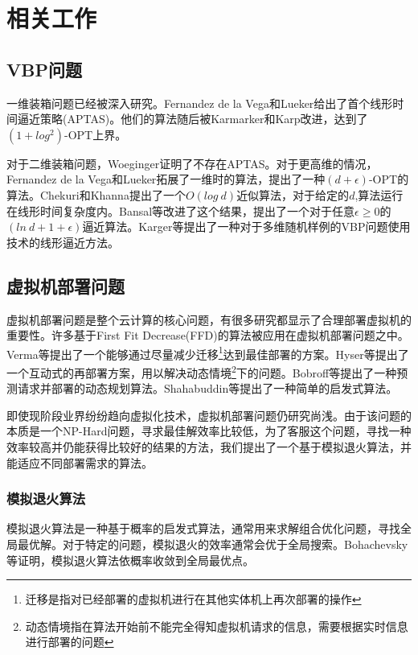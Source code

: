 
\chapter{相关工作}
\label{chap:2}

\section*{VBP问题}
一维装箱问题已经被深入研究。Fernandez de la Vega和Lueker\cite{Vega81}给出了首个线形时间逼近策略(APTAS)。他们的算法随后被Karmarker和Karp\cite{Karm82}改进，达到了$(1+log^2)$-\textsf{OPT}上界。

对于二维装箱问题，Woeginger\cite{Woeg97}证明了不存在APTAS。对于更高维的情况，Fernandez de la Vega和Lueker拓展了一维时的算法，提出了一种$(d+\epsilon)$-\textsf{OPT}的算法。Chekuri和Khanna\cite{Chan99}提出了一个$O(log~d)$近似算法，对于给定的$d$,算法运行在线形时间复杂度内。Bansal等\cite{Bans07}改进了这个结果，提出了一个对于任意$\epsilon \geq 0$的$(ln~d + 1 + \epsilon)$逼近算法。Karger等\cite{Karg07}提出了一种对于多维随机样例的VBP问题使用技术的线形逼近方法。

\section*{虚拟机部署问题}

虚拟机部署问题是整个云计算的核心问题，有很多研究都显示了合理部署虚拟机的重要性\cite{Grit06}\cite{Bian04}。许多基于First Fit Decrease(FFD)的算法被应用在虚拟机部署问题之中。Verma等\cite{Verm08}提出了一个能够通过尽量减少迁移\footnote{迁移是指对已经部署的虚拟机进行在其他实体机上再次部署的操作}达到最佳部署的方案。Hyser等\cite{Hyse07}提出了一个互动式的再部署方案，用以解决动态情境\footnote{动态情境指在算法开始前不能完全得知虚拟机请求的信息，需要根据实时信息进行部署的问题}下的问题。Bobroff等\cite{Bobr07}提出了一种预测请求并部署的动态规划算法。Shahabuddin等\cite{Shah01}提出了一种简单的启发式算法。

即使现阶段业界纷纷趋向虚拟化技术，虚拟机部署问题仍研究尚浅。由于该问题的本质是一个NP-Hard问题，寻求最佳解效率比较低，为了客服这个问题，寻找一种效率较高并仍能获得比较好的结果的方法，我们提出了一个基于模拟退火算法，并能适应不同部署需求的算法。

\subsection*{模拟退火算法}
\label{sec:sa-inro}

模拟退火算法是一种基于概率的启发式算法，通常用来求解组合优化问题，寻找全局最优解。对于特定的问题，模拟退火的效率通常会优于全局搜索。Bohachevsky等证明，模拟退火算法依概率收敛到全局最优点。

